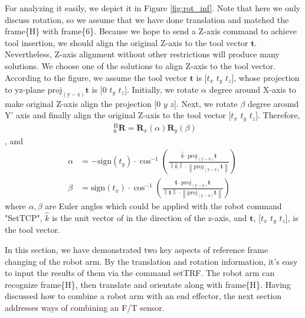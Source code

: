 \par
For analyzing it easily, we depict it in Figure \ref{fig:rot_inf}. Note that here we only discuss rotation, so we assume that we have done translation and matched the frame\{H\} with frame\{6\}. Because we hope to send a Z-axis command to achieve tool insertion, we should align the original Z-axis to the tool vector $\boldsymbol{t}$. Nevertheless, Z-axis alignment without other restrictions will produce many solutions. We choose one of the solutions to align Z-axis to the tool vector. According to the figure, we assume the tool vector $\boldsymbol{t}$ is [$t_x$ $t_y$ $t_z$], whose projection to yz-plane $\mathrm{proj_{(y-z)}}\boldsymbol{t}$ is [0 $t_y$ $t_z$]. Initially, we rotate $\alpha$ degree around X-axis to make original Z-axis align the projection [$0$ $y$ $z$]. Next, we rotate $\beta$ degree around Y' axis and finally align the original Z-axis to the tool vector [$t_x$ $t_y$ $t_z$]. Therefore, 
\begin{equation}
\begin{split}
\ \  _{\mathrm{6}}^{\mathrm{H}}\mathbf{R} = \mathbf{R}_x(\alpha )\mathbf{R}_y(\beta )
\end{split}
\end{equation}
, and 
\begin{equation}
\begin{split}
\alpha &= 
-\mathrm{sign}(t_y)\cdot \cos^{-1} \left(  \frac{\hat{k}						\cdot 		\mathrm{proj_{(y-z)}}\boldsymbol{t}				}
								 				{\left \| \hat{k} \right \| 	\cdot \left \| \mathrm{proj_{(y-z)}}\boldsymbol{t} \right \|} \right)\ \\
\beta  &= 
\mathrm{sign}(t_x)\cdot \cos^{-1} \left( \frac{\textbf{t}							\cdot 		\mathrm{proj_{(y-z)}}\boldsymbol{t}			}
								  			  {\left \| \textbf{t}\right \| 	\cdot \left \| \mathrm{proj_{(y-z)}}\boldsymbol{t} \right \|} \right)\ 
\end{split}
\end{equation}
where $\alpha,\beta$ are Euler angles which could be applied with the robot command "SetTCP", $\hat{k}$ is the unit vector of in the direction of the z-axis, and $\boldsymbol{t}$, [$t_x$ $t_y$ $t_z$], is the tool vector.
\par
In this section, we have demonstrated two key aspects of reference frame changing of the robot arm. By the translation and rotation information, it's easy to input the results of them via the command setTRF. The robot arm can recognize frame\{H\}, then translate and orientate along with frame\{H\}. Having discussed how to combine a robot arm with an end effector, the next section addresses ways of combining an F/T sensor.